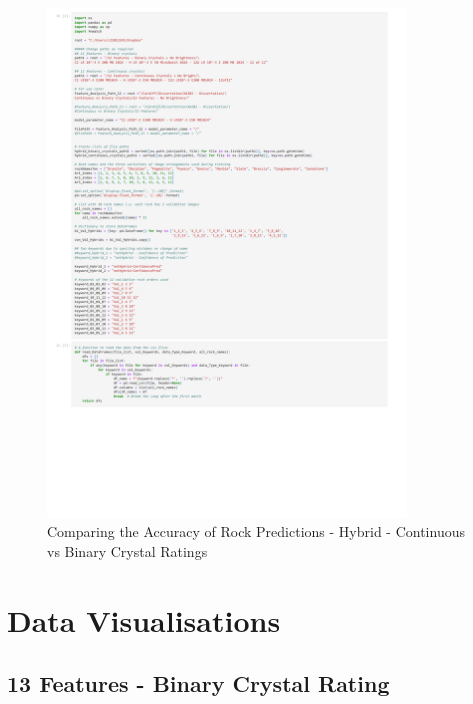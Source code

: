 \begin{figure}[H]
  \centering
    \includegraphics[page=6, width=0.85\textwidth, trim= 20 100 20 10, clip]{Code/Compare2HybridModels V7.pdf}
    \caption{Comparing the Accuracy of Rock Predictions - Hybrid - Continuous vs Binary Crystal Ratings} \label{fig:Comparing the Accuracy of Rock Predictions - Hybrid - Continuous vs Binary Crystal Ratings}
\end{figure}



\section{Data Visualisations} \label{Data Visualisations}

\subsection{13 Features - Binary Crystal Rating} 

